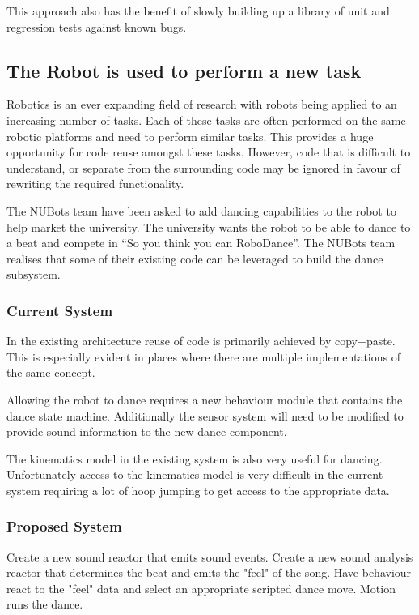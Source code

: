 \documentclass[english,12pt]{scrartcl}
\begin{document}
				This approach also has the benefit of slowly building up a library of unit and regression tests against known bugs.

		\subsection{The Robot is used to perform a new task}
			Robotics is an ever expanding field of research with robots being applied to an
			increasing number of tasks. Each of these tasks are often performed on the same robotic
			platforms and need to perform similar tasks. This provides a huge opportunity for code
			reuse amongst these tasks. However, code that is difficult to understand, or separate
			from the surrounding code may be ignored in favour of rewriting the required
			functionality.

			The NUBots team have been asked to add dancing capabilities to the robot to help market the 
			university. The university wants the robot to be able to dance to a beat and compete in 
			``So you think you can RoboDance''. The NUBots team realises that some of their existing
			code can be leveraged to build the dance subsystem.

			\subsubsection{Current System}
				In the existing architecture reuse of code is primarily achieved by copy+paste. This is 
				especially evident in places where there are multiple implementations of the same concept.
				
				Allowing the robot to dance requires a new behaviour module that contains the dance state
				machine. Additionally the sensor system will need to be modified to provide sound information
				to the new dance component. 
				
				The kinematics model in the existing system is also very useful for dancing. Unfortunately access
				to the kinematics model is very difficult in the current system requiring a lot of hoop jumping to
				get access to the appropriate data. 
			\subsubsection{Proposed System}
				Create a new sound reactor that emits sound events. 
				Create a new sound analysis reactor that determines the beat and emits
				the "feel" of the song.
				Have behaviour react to the "feel" data and select an appropriate scripted dance move.
				Motion runs the dance.
\end{document}

